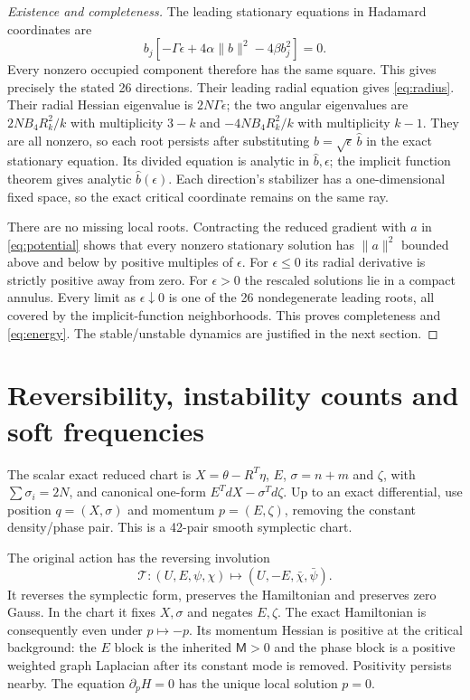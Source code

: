 \documentclass[11pt,a4paper]{article}
\begin{document}
\begin{proof}[Existence and completeness]
The leading stationary equations in Hadamard coordinates are
\[
b_j[-\Gamma\epsilon+4\alpha\|b\|^2-4\beta b_j^2]=0.
\]
Every nonzero occupied component therefore has the same square. This gives precisely the stated 26 directions. Their leading radial equation gives \eqref{eq:radius}. Their radial Hessian eigenvalue is $2N\Gamma\epsilon$; the two angular eigenvalues are $2NB_4R_k^2/k$ with multiplicity $3-k$ and $-4NB_4R_k^2/k$ with multiplicity $k-1$. They are all nonzero, so each root persists after substituting $b=\sqrt\epsilon\,\widehat b$ in the exact stationary equation. Its divided equation is analytic in $\widehat b,\epsilon$; the implicit function theorem gives analytic $\widehat b(\epsilon)$. Each direction's stabilizer has a one-dimensional fixed space, so the exact critical coordinate remains on the same ray.

There are no missing local roots. Contracting the reduced gradient with $a$ in \eqref{eq:potential} shows that every nonzero stationary solution has $\|a\|^2$ bounded above and below by positive multiples of $\epsilon$. For $\epsilon\le0$ its radial derivative is strictly positive away from zero. For $\epsilon>0$ the rescaled solutions lie in a compact annulus. Every limit as $\epsilon\downarrow0$ is one of the 26 nondegenerate leading roots, all covered by the implicit-function neighborhoods. This proves completeness and \eqref{eq:energy}. The stable/unstable dynamics are justified in the next section.
\end{proof}

\newpage
\section{Reversibility, instability counts and soft frequencies}
The scalar exact reduced chart is $X=\theta-R^T\eta$, $E$, $\sigma=n+m$ and $\zeta$, with $\sum\sigma_i=2N$, and canonical one-form $E^T dX-\sigma^Td\zeta$. Up to an exact differential, use position $q=(X,\sigma)$ and momentum $p=(E,\zeta)$, removing the constant density/phase pair. This is a 42-pair smooth symplectic chart.

The original action has the reversing involution
\[
\mathcal T:(U,E,\psi,\chi)\longmapsto(U,-E,\bar\chi,\bar\psi).
\]
It reverses the symplectic form, preserves the Hamiltonian and preserves zero Gauss. In the chart it fixes $X,\sigma$ and negates $E,\zeta$. The exact Hamiltonian is consequently even under $p\mapsto-p$. Its momentum Hessian is positive at the critical background: the $E$ block is the inherited $\mathsf M>0$ and the phase block is a positive weighted graph Laplacian after its constant mode is removed. Positivity persists nearby. The equation $\partial_pH=0$ has the unique local solution $p=0$.
\end{document}

